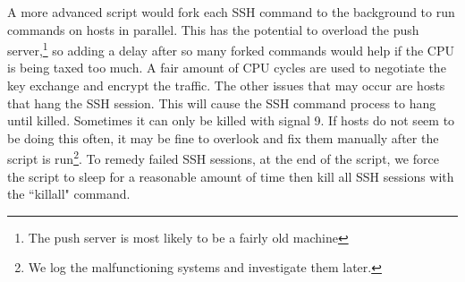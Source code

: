 A more advanced script would fork each SSH command to the background to run commands on hosts in parallel.  This has the potential to overload the push server,\footnote{The push server is most likely to be a fairly old machine} so adding a delay after so many forked commands would help if the CPU is being taxed too much.  A fair amount of CPU cycles are used to negotiate the key exchange and encrypt the traffic.  The other issues that may occur are hosts that hang the SSH session.  This will cause the SSH command process to hang until killed.  Sometimes it can only be killed with signal 9.  If hosts do not seem to be doing this often, it may be fine to overlook and fix them manually after the script is run\footnote{We log the malfunctioning systems and investigate them later.}.  To remedy failed SSH sessions, at the end of the script, we force the script to sleep for a reasonable amount of time then kill all SSH sessions with the ``killall" command.  

